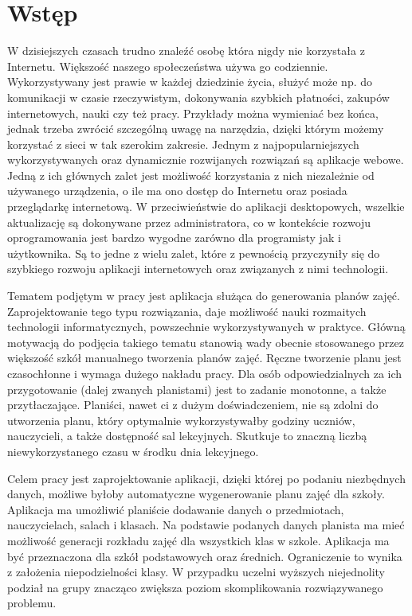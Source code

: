 
\chapter{Wstęp}
W dzisiejszych czasach trudno znaleźć osobę która nigdy nie korzystała z Internetu. Większość naszego społeczeństwa używa go codziennie. Wykorzystywany jest prawie w każdej dziedzinie życia, służyć może np. do komunikacji w czasie rzeczywistym, dokonywania szybkich płatności, zakupów internetowych, nauki czy też pracy. Przykłady można wymieniać bez końca, jednak trzeba zwrócić szczególną uwagę na narzędzia, dzięki którym możemy korzystać z sieci w tak szerokim zakresie. Jednym z najpopularniejszych wykorzystywanych oraz dynamicznie rozwijanych rozwiązań są aplikacje webowe. Jedną z ich głównych zalet jest możliwość korzystania z nich niezależnie od używanego urządzenia, o ile ma ono dostęp do Internetu oraz posiada przeglądarkę internetową. W przeciwieństwie do aplikacji desktopowych, wszelkie aktualizację są dokonywane przez administratora, co w kontekście rozwoju oprogramowania jest bardzo wygodne zarówno dla programisty jak i użytkownika. Są to jedne z wielu zalet, które z pewnością przyczyniły się do szybkiego rozwoju aplikacji internetowych oraz związanych z nimi technologii.

Tematem podjętym w pracy jest aplikacja służąca do generowania planów zajęć. Zaprojektowanie tego typu rozwiązania, daje możliwość nauki rozmaitych technologii informatycznych, powszechnie wykorzystywanych w praktyce. Główną motywacją do podjęcia takiego tematu stanowią wady obecnie stosowanego przez większość szkół manualnego tworzenia planów zajęć. Ręczne tworzenie planu jest czasochłonne i wymaga dużego nakładu pracy. Dla osób odpowiedzialnych za ich przygotowanie (dalej zwanych planistami) jest to zadanie monotonne, a także przytłaczające. Planiści, nawet ci z dużym doświadczeniem, nie są zdolni do utworzenia planu, który optymalnie wykorzystywałby godziny uczniów, nauczycieli, a także dostępność sal lekcyjnych. Skutkuje to znaczną liczbą niewykorzystanego czasu w środku dnia lekcyjnego.

Celem pracy jest zaprojektowanie aplikacji, dzięki której po podaniu niezbędnych danych, możliwe byłoby automatyczne wygenerowanie planu zajęć dla szkoły. Aplikacja ma umożliwić planiście dodawanie danych o przedmiotach, nauczycielach, salach i klasach. Na podstawie podanych danych planista ma mieć możliwość generacji rozkładu zajęć dla wszystkich klas w szkole. Aplikacja ma być przeznaczona dla szkół podstawowych oraz średnich. Ograniczenie to wynika z założenia niepodzielności klasy. W przypadku uczelni wyższych niejednolity podział na grupy znacząco zwiększa poziom skomplikowania rozwiązywanego problemu. 

